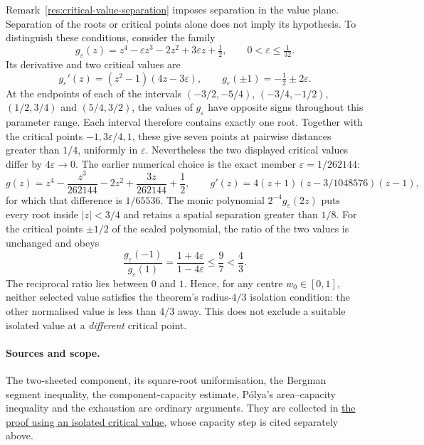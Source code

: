 Remark~\ref{res:critical-value-separation} imposes separation in the
value plane. Separation of the roots or critical points alone does not
imply its hypothesis.
To distinguish these conditions, consider the family
\[
 g_\varepsilon(z)=z^4-\varepsilon z^3-2z^2+3\varepsilon z+\tfrac12,
 \qquad 0<\varepsilon\le\tfrac1{32}.
\]
Its derivative and two critical values are
\[
 g_\varepsilon'(z)=(z^2-1)(4z-3\varepsilon),\qquad
 g_\varepsilon(\pm1)=-\tfrac12\pm2\varepsilon.
\]
At the endpoints of each of the intervals
$(-3/2,-5/4)$, $(-3/4,-1/2)$, $(1/2,3/4)$ and $(5/4,3/2)$,
the values of $g_\varepsilon$ have opposite signs throughout this parameter
range. Each interval therefore contains exactly one root. Together with
the critical points $-1,3\varepsilon/4,1$, these give seven points at
pairwise distances greater than $1/4$, uniformly in $\varepsilon$.
Nevertheless the two displayed critical values differ by $4\varepsilon\to0$.
The earlier numerical choice is the exact member $\varepsilon=1/262144$:
\[
 g(z)=z^4-\frac{z^3}{262144}-2z^2+\frac{3z}{262144}+\frac12,
 \qquad
 g'(z)=4(z+1)(z-3/1048576)(z-1),
\]
for which that difference is $1/65536$.
The monic polynomial $2^{-4}g_\varepsilon(2z)$ puts every root inside
$|z|<3/4$ and retains a spatial separation greater than $1/8$.
For the critical points $\pm1/2$ of the scaled polynomial, the ratio
of the two values is unchanged and obeys
\[
 \frac{g_\varepsilon(-1)}{g_\varepsilon(1)}
 =\frac{1+4\varepsilon}{1-4\varepsilon}\le\frac97<\frac43.
\]
The reciprocal ratio lies between $0$ and $1$. Hence, for any centre
$w_0\in[0,1]$, neither selected value satisfies the theorem's
radius-$4/3$ isolation condition: the other normalised value is less
than $4/3$ away. This does not exclude a suitable isolated value at a
\emph{different} critical point.

\paragraph{Sources and scope.}
\label{bdry:critical-value-separation}
The two-sheeted component, its square-root uniformisation, the Bergman segment
inequality, the component-capacity estimate, P\'olya's area--capacity
inequality and the exhaustion are ordinary arguments. They are collected in
\href{https://github.com/wcook04/plectis-erdos/blob/8efbccc235df64a38d83f5dc7b1949e2ad18270d/research_corpus/Erdos1041/problem/DiskFamilyCriticalValueSeparation.md}{the proof using an isolated critical value}, whose capacity step is cited
separately above.

